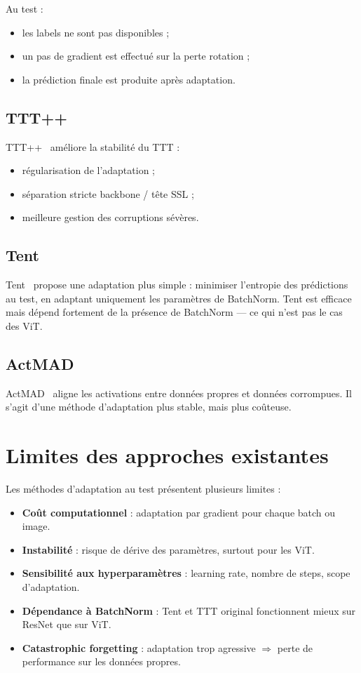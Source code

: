 \documentclass[12pt,a4paper]{report}
\begin{document}
	Au test :
	\begin{itemize}
		\item les labels ne sont pas disponibles ;
		\item un pas de gradient est effectué sur la perte rotation ;
		\item la prédiction finale est produite après adaptation.
	\end{itemize}
	
	\subsection{TTT++}
	
	TTT++~\cite{Liu2021} améliore la stabilité du TTT :
	\begin{itemize}
		\item régularisation de l’adaptation ;
		\item séparation stricte backbone / tête SSL ;
		\item meilleure gestion des corruptions sévères.
	\end{itemize}
	
	\subsection{Tent}
	
	Tent~\cite{Wang2021} propose une adaptation plus simple :  
	minimiser l’entropie des prédictions au test, en adaptant uniquement les paramètres de BatchNorm.  
	Tent est efficace mais dépend fortement de la présence de BatchNorm — ce qui n’est pas le cas des ViT.
	
	\subsection{ActMAD}
	
	ActMAD~\cite{Mirza2023} aligne les activations entre données propres et données corrompues.  
	Il s’agit d’une méthode d’adaptation plus stable, mais plus coûteuse.
	
	\section{Limites des approches existantes}
	
	Les méthodes d’adaptation au test présentent plusieurs limites :
	
	\begin{itemize}
		\item \textbf{Coût computationnel} : adaptation par gradient pour chaque batch ou image.
		\item \textbf{Instabilité} : risque de dérive des paramètres, surtout pour les ViT.
		\item \textbf{Sensibilité aux hyperparamètres} : learning rate, nombre de steps, scope d’adaptation.
		\item \textbf{Dépendance à BatchNorm} : Tent et TTT original fonctionnent mieux sur ResNet que sur ViT.
		\item \textbf{Catastrophic forgetting} : adaptation trop agressive $\Rightarrow$ perte de performance sur les données propres.
	\end{itemize}
	
\end{document}
